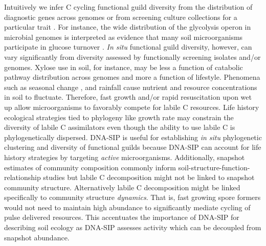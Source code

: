 Intuitively we infer C cycling functional guild diversity from the distribution
of diagnostic genes across genomes \citep{Berlemont2013} or from screening
culture collections for a particular trait \citep{Martiny2013}. For
instance, the wide distribution of the glycolysis operon in microbial
genomes is interpreted as evidence that many soil microorganisms
participate in glucose turnover \citep{McGuire2010}. \textit{In situ}
functional guild diversity, however, can vary significantly from diversity
assessed by functionally screening isolates and/or genomes. Xylose use in soil,
for instance, may be less a function of catabolic pathway distribution across
genomes and more a function of lifestyle. Phenomena such as seasonal change
\citep{Schmidt2007}, and rainfall \citep{Placella2012} cause nutrient and
resource concentrations in soil to fluctuate. Therefore, fast growth and/or
rapid resuscitation upon wet up \citep{Placella2012} allow microorganisms to
favorably compete for labile C resources. Life history ecological strategies
tied to phylogeny like growth rate \cite{Fierer2007} may constrain the
diversity of labile C assimilators even though the ability to use labile C is
phylogenetically dispersed. DNA-SIP is useful for establishing \textit{in situ}
phylogenetic clustering and diversity of functional guilds because DNA-SIP can
account for life history strategies by targeting \textit{active}
microorganisms. Additionally, snapshot estimates of community composition
commonly inform soil-structure-function-relationship studies \citep{Fierer2007}
but labile C decomposition might not be linked to snapshot community structure.
Alternatively labile C decomposition might be linked specifically to community
structure \textit{dynamics}. That is, fast growing spore formers would not need
to maintain high abundance to significantly mediate cycling of pulse delivered
resources. This accentuates the importance of DNA-SIP for describing soil
ecology as DNA-SIP assesses activity which can be decoupled from snapshot
abundance.

